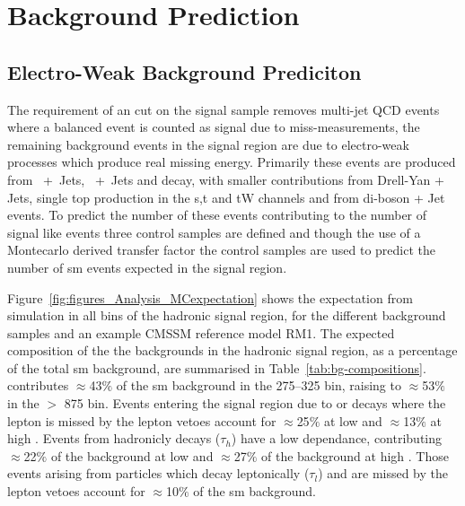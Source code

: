 \chapter{Background Prediction} %

\section{Electro-Weak Background Prediciton} %
\label{sec:electro_weak_background_prediciton}

The requirement of an \alt cut on the signal sample removes multi-jet QCD 
events where a balanced event is counted as signal due to miss-measurements, 
the remaining background events in the signal region are due to electro-weak 
processes which produce real missing energy. Primarily these events are 
produced from \HepProcess{\PZ\to\Pnu\APnu}~+~Jets, 
\HepProcess{\PW\to\Pl\APnu}~+~Jets and \HepProcess{\Ptop\APtop} decay, with 
smaller contributions from Drell-Yan + Jets, single top production in the s,t 
and tW channels and from di-boson + Jet events. To predict the number of these 
events contributing to the number of signal like events three control samples 
are defined and though the use of a Montecarlo derived transfer factor the 
control samples are used to predict the number of \ac{sm} events expected in 
the signal region.


Figure~\ref{fig:figures_Analysis_MCexpectation}\cite{CMS-AN-11-517} shows the 
expectation from simulation in all bins of the hadronic signal region, for the 
different background samples and an example CMSSM reference model RM1. 
The expected composition of the the backgrounds in the hadronic signal region, 
as a percentage of the total \ac{sm} background, are summarised in 
Table~\ref{tab:bg-compositions}. \HepProcess{\PZ\to\nu\nu} contributes 
$\approx$43$\%$ of the \ac{sm} background in the 
\unit{275}{\GeV}--\unit{325}{\GeV} \HT bin, raising to $\approx$53$\%$ in the 
\HT $>$ \unit{875}{\GeV} bin. Events entering the signal region due to \PZ or 
\PW decays where the lepton is missed by the lepton vetoes account for 
$\approx$25$\%$ at low \HT and $\approx$13$\%$ at high \HT. Events from 
hadronicly decays \Ptau ($\tau_{h}$) have a low \HT dependance, contributing 
$\approx$22$\%$ of the background at low \HT and $\approx$27$\%$ of the 
background at high \HT. Those events arising from \Ptau particles which decay leptonically ($\tau_{l}$) and are missed by the lepton vetoes account for $\approx$10$\%$ of the \ac{sm} background.

